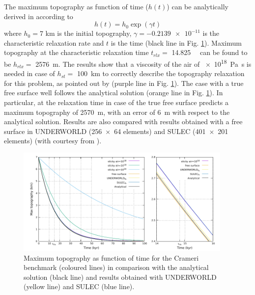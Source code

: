 \documentclass[hidelinks,11pt,a4paper]{article}
\begin{document}
The maximum topography as function of time ($h(t)$) can be analytically derived in according to \[h(t)=h_0 \exp(\gamma t)\]
where $h_0=7$ km is the initial topography, $\gamma=\num{-0.2139e-11}$ is the characteristic relaxation rate and $t$ is the time (black line in Fig. \ref{fig:crameri}). Maximum topography at the characteristic relaxation time $t_{rlx}=$ \SI{14.825}{\kilo\year} can be found to be $h_{rlx}=$ \SI{2576}{\m}. The results show that a viscosity of the air of \SI{e18}{\pascal\s} is needed in case of $h_{st}=$ \SI{100}{\km} to correctly describe the topography relaxation for this problem, as pointed out by \citet{Crameri2012} (purple line in Fig. \ref{fig:crameri}). The case with a true free surface well follows the analytical solution (orange line in Fig. \ref{fig:crameri}). In particular, at the relaxation time in case of the true free surface predicts a maximum topography of \SI{2570}{\m}, with an error of \SI{6}{\m} with respect to the analytical solution. Results are also compared with results obtained with a free surface in UNDERWORLD (\num{256x64} elements) and SULEC (\num{401x201} elements) (with courtesy from \citet{Crameri2012}).

\begin{figure}
\centering
\noindent\includegraphics[width=400px]{./Figures/Crameri.pdf}
\caption{Maximum topography as function of time for the Crameri benchmark (coloured lines) in comparison with the analytical solution (black line) and results obtained with UNDERWORLD (yellow line) and SULEC (blue line).}
\label{fig:crameri}
\end{figure}
\end{document}
